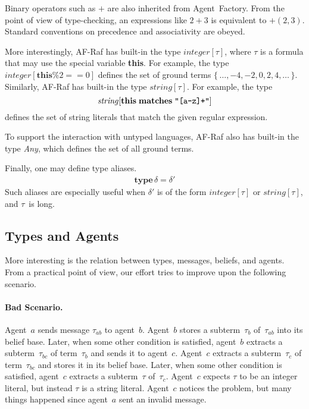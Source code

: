 \documentclass[preprint]{sigplanconf} %
\theoremstyle{remark}
\begin{document}
Binary operators such as $+$ are also inherited from Agent~Factory. From
the point of view of type-checking, an expressions like $2+3$ is equivalent
to $+(2,3)$. Standard conventions on precedence and associativity are
obeyed.

More interestingly, AF-Raf has built-in the type $\mathit{integer}[\tau]$,
where $\tau$ is a formula that may use the special variable \textbf{this}.
For example, the type $\mathit{integer}[\mathbf{this}\%2==0]$ defines the
set of ground terms $\{\,\ldots,-4,-2,0,2,4,\ldots\,\}$. Similarly, AF-Raf
has built-in the type $\mathit{string}[\tau]$. For example, the type
\[\mathit{string}[\mathbf{this}\;\mathbf{matches}\;\verb|"[a-z]+"|]\]
defines the set of string literals that match the given regular expression.

To support the interaction with untyped languages, AF-Raf also has built-in
the type \textit{Any}, which defines the set of all ground terms.

Finally, one may define type aliases.
\begin{align}
\mathbf{type}\,\delta=\delta'
\end{align}
Such aliases are especially useful when $\delta'$ is of the form
$\mathit{integer}[\tau]$ or $\mathit{string}[\tau]$, and $\tau$~is long.

\subsection{Types and Agents}

More interesting is the relation between types, messages, beliefs, and
agents. From a practical point of view, our effort tries to improve upon
the following scenario.

\paragraph{Bad Scenario.}

Agent~$a$ sends message $\tau_{ab}$ to agent~$b$. Agent~$b$ stores a
subterm~$\tau_b$ of~$\tau_{ab}$ into its belief base. Later, when some
other condition is satisfied, agent~$b$ extracts a subterm~$\tau_{bc}$ of
term~$\tau_b$ and sends it to agent~$c$. Agent~$c$ extracts a
subterm~$\tau_c$ of term~$\tau_{bc}$ and stores it in its belief base.
Later, when some other condition is satisfied, agent~$c$ extracts a
subterm~$\tau$ of~$\tau_c$. Agent~$c$ expects $\tau$ to be an integer
literal, but instead $\tau$ is a string literal. Agent~$c$ notices the
problem, but many things happened since agent~$a$ sent an invalid message.
\end{document}
